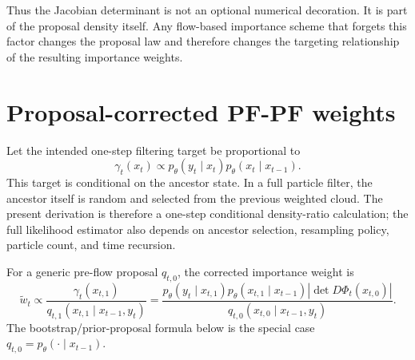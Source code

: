 Thus the Jacobian determinant is not an optional numerical decoration.  It is
part of the proposal density itself.  Any flow-based importance scheme that
forgets this factor changes the proposal law and therefore changes the targeting
relationship of the resulting importance weights.

\section{Proposal-corrected PF-PF weights}
\label{sec:bf-pfpf-corrected-weights}

Let the intended one-step filtering target be proportional to
\begin{equation}
\label{eq:bf-pfpf-target-density}
  \gamma_t(x_t)
  \propto p_\theta(y_t \mid x_t)
          p_\theta(x_t \mid x_{t-1}).
\end{equation}
This target is conditional on the ancestor state.  In a full particle filter,
the ancestor itself is random and selected from the previous weighted cloud.
The present derivation is therefore a one-step conditional density-ratio
calculation; the full likelihood estimator also depends on ancestor selection,
resampling policy, particle count, and time recursion.

For a generic pre-flow proposal $q_{t,0}$, the corrected importance weight is
\begin{equation}
\label{eq:bf-pfpf-generic-weight}
  \tilde w_t
  \propto
  \frac{\gamma_t(x_{t,1})}
       {q_{t,1}(x_{t,1}\mid x_{t-1},y_t)}
  =
  \frac{p_\theta(y_t\mid x_{t,1})
        p_\theta(x_{t,1}\mid x_{t-1})
        \left|\det D\Phi_t(x_{t,0})\right|}
       {q_{t,0}(x_{t,0}\mid x_{t-1},y_t)}.
\end{equation}
The bootstrap/prior-proposal formula below is the special case
$q_{t,0}=p_\theta(\cdot\mid x_{t-1})$.

